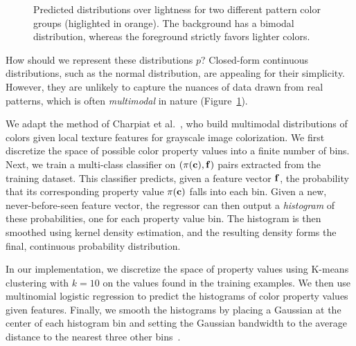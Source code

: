 \begin{figure}[ht]
\caption{Predicted distributions over lightness for two different pattern color groups (higlighted in orange). The background has a bimodal distribution, whereas the foreground strictly favors lighter colors.}
\label{fig:unaryHistograms}
\vspace{-1.0em}
\end{figure}

How should we represent these distributions $p$? Closed-form continuous distributions, such as the normal distribution, are appealing for their simplicity.  However, they are unlikely to capture the nuances of data drawn from real patterns, which is often \emph{multimodal} in nature (Figure~\ref{fig:unaryHistograms}).

We adapt the method of Charpiat et al.~, who build multimodal distributions of colors given local texture features for grayscale image colorization. We first discretize the space of possible color property values into a finite number of bins. Next, we train a multi-class classifier on $(\pi(\mathbf{c}), \mathbf{f})$ pairs extracted from the training dataset. This classifier predicts, given a feature vector $\mathbf{f}$, the probability that its corresponding property value $\pi(\mathbf{c})$ falls into each bin. Given a new, never-before-seen feature vector, the regressor can then output a \emph{histogram} of these probabilities, one for each property value bin. The histogram is then smoothed using kernel density estimation, and the resulting density forms the final, continuous probability distribution.

In our implementation, we discretize the space of property values using K-means clustering with $k = 10$ on the values found in the training examples. We then use multinomial logistic regression to predict the histograms of color property values given features.
Finally, we smooth the histograms by placing a Gaussian at the center of each histogram bin and setting the Gaussian bandwidth to the average distance to the nearest three other bins~\cite{ThemeEnhancement}.